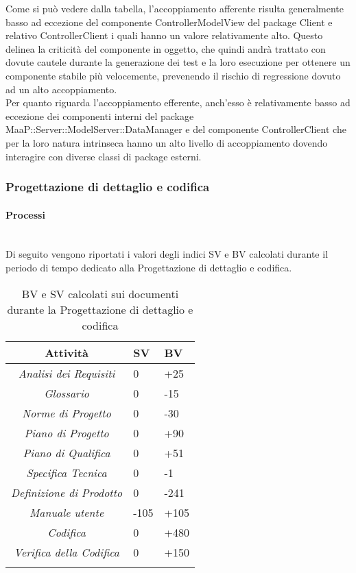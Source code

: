 Come si può vedere dalla tabella, l'accoppiamento afferente risulta generalmente basso ad eccezione del componente ControllerModelView del package Client e relativo ControllerClient i quali hanno un valore relativamente alto. Questo delinea la criticità del componente in oggetto, che quindi andrà trattato con dovute cautele durante la generazione dei test e la loro esecuzione per ottenere un componente stabile più velocemente, prevenendo il rischio di regressione dovuto ad un alto accoppiamento.\\
Per quanto riguarda l'accoppiamento efferente, anch'esso è relativamente basso ad eccezione dei componenti interni del package MaaP::Server::ModelServer::DataManager e del componente ControllerClient che per la loro natura intrinseca hanno un alto livello di accoppiamento dovendo interagire con diverse classi di package esterni.

\subsubsection{Progettazione di dettaglio e codifica}
\paragraph{Processi} \hfill\\
Di seguito vengono riportati i valori degli indici SV e BV calcolati durante il periodo di tempo dedicato alla Progettazione di dettaglio e codifica.
\begin{longtable}{|c|p{3cm}|p{3cm}|}
\toprule
\textbf{Attività} & \textbf{SV} & \textbf{BV} \\


\midrule
\emph{Analisi dei Requisiti} & 0 & +25 \\
\midrule
\emph{Glossario} & 0 & -15  \\
\midrule
\emph{Norme di Progetto} & 0 & -30 \\
\midrule
\emph{Piano di Progetto} & 0 & +90 \\
\midrule
\emph{Piano di Qualifica} & 0 & +51\\
\midrule
\emph{Specifica Tecnica} & 0 & -1\\
\midrule
\emph{Definizione di Prodotto} & 0 & -241 \\
\midrule
\emph{Manuale utente} & -105 & +105 \\
\midrule
\emph{Codifica} & 0 & +480 \\
\midrule
\emph{Verifica della Codifica} & 0 & +150 \\
\bottomrule
\caption{BV e SV calcolati sui documenti durante la Progettazione di dettaglio e codifica}
\label{tab:changelog}
\end{longtable}


